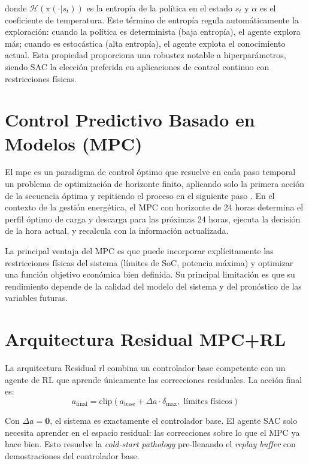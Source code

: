 \documentclass[12pt, a4paper, twoside]{report}
\begin{document}
donde $\mathcal{H}(\pi(\cdot|s_t))$ es la entropía de la política en el estado
$s_t$ y $\alpha$ es el coeficiente de temperatura. Este término de entropía
regula automáticamente la exploración: cuando la política es determinista
(baja entropía), el agente explora más; cuando es estocástica (alta entropía),
el agente explota el conocimiento actual. Esta propiedad proporciona una
robustez notable a hiperparámetros, siendo SAC la elección preferida en
aplicaciones de control continuo con restricciones físicas.

\section{Control Predictivo Basado en Modelos (MPC)}
\label{sec:mpc_teoria}

El \acrfull{mpc} es un paradigma de control óptimo que resuelve en cada paso
temporal un problema de optimización de horizonte finito, aplicando solo la
primera acción de la secuencia óptima y repitiendo el proceso en el siguiente
paso \citep{Rawlings2017}. En el contexto de la gestión energética, el MPC
con horizonte de 24 horas determina el perfil óptimo de carga y descarga para
las próximas 24 horas, ejecuta la decisión de la hora actual, y recalcula con
la información actualizada.

La principal ventaja del MPC es que puede incorporar explícitamente las
restricciones físicas del sistema (límites de SoC, potencia máxima) y optimizar
una función objetivo económica bien definida. Su principal limitación es que
su rendimiento depende de la calidad del modelo del sistema y del pronóstico
de las variables futuras.

\section{Arquitectura Residual MPC+RL}
\label{sec:residual_teoria}

La arquitectura Residual \acrshort{rl} \citep{Johannink2019} combina un
controlador base competente con un agente de RL que aprende únicamente las
correcciones residuales. La acción final es:
\begin{equation}
  a_{\text{final}} = \text{clip}\!\left(
    a_{\text{base}} + \Delta a \cdot \delta_{\max},\;
    \text{límites físicos}
  \right)
  \label{eq:residual_general}
\end{equation}

Con $\Delta a = \mathbf{0}$, el sistema es exactamente el controlador base.
El agente SAC solo necesita aprender en el espacio residual: las correcciones
sobre lo que el MPC ya hace bien. Esto resuelve la \textit{cold-start pathology}
pre-llenando el \textit{replay buffer} con demostraciones del controlador base.
\end{document}

